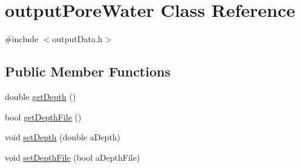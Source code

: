 \hypertarget{classoutput_pore_water}{
\section{outputPoreWater Class Reference}
\label{classoutput_pore_water}
}


{\ttfamily \#include $<$outputData.h$>$}\subsection*{Public Member Functions}
\begin{DoxyCompactItemize}
\item 
double \hyperlink{classoutput_pore_water_a2e795fa5383bdca42f79ba656ec9c505}{getDepth} ()
\item 
bool \hyperlink{classoutput_pore_water_a224a940839a8d80815657147fb7d87c1}{getDepthFile} ()
\item 
void \hyperlink{classoutput_pore_water_abfd490e51343b58a40e8f4aaf63e21c5}{setDepth} (double aDepth)
\item 
void \hyperlink{classoutput_pore_water_aa87dec5f2c83082703ae65479363b7f4}{setDepthFile} (bool aDepthFile)
\end{DoxyCompactItemize}


